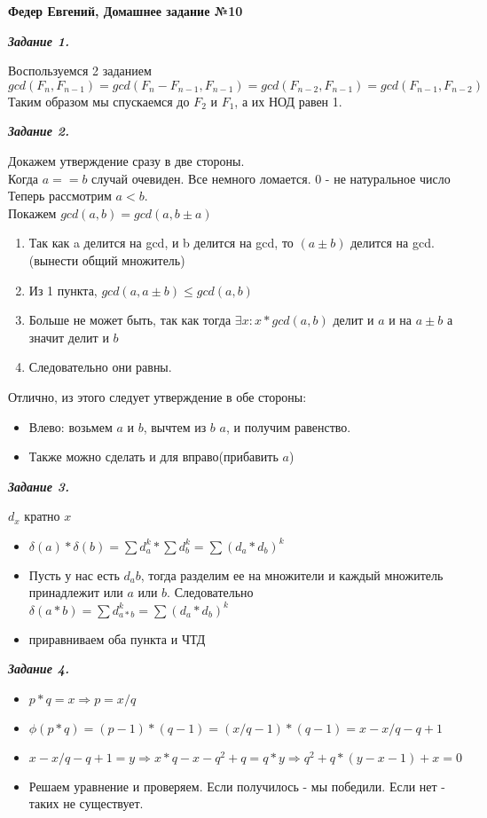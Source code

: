 \documentclass[12pt, a4paper]{scrartcl}
\begin{document}
	\LARGE{\textbf{Федер Евгений, Домашнее задание №10}}\par
	
	\emph{\textbf{Задание 1.}}\par
	Воспользуемся 2 заданием \\
	$gcd(F_n, F_{n - 1}) = gcd(F_n - F_{n - 1}, F_{n - 1}) = gcd(F_{n - 2}, F_{n - 1}) = gcd(F_{n - 1}, F_{n - 2})$ \\
	Таким образом мы спускаемся до $F_2$ и $F_1$, а их НОД равен 1.
	
	\emph{\textbf{Задание 2.}}\par
		Докажем утверждение сразу в две стороны.\\
		Когда $a == b$ случай очевиден. Все немного ломается. 0 - не натуральное число\\
		Теперь рассмотрим $a < b$.\\
		Покажем $gcd(a, b) = gcd(a, b \pm a)$ 
		\begin{enumerate}
			\item Так как a делится на gcd, и b делится на gcd, то $(a \pm b)$ делится на gcd.(вынести общий множитель)
			\item Из 1 пункта, $gcd(a, a \pm b) \leq gcd(a, b)$
			\item Больше не может быть, так как тогда $\exists x : x * gcd(a, b)$ делит и $a$ и на $a \pm b$ а значит делит и $b$
			\item Следовательно они равны.
		\end{enumerate}
		Отлично, из этого следует утверждение в обе стороны:
		\begin{itemize}
			\item Влево: возьмем $a$ и $b$, вычтем из $b$ $a$, и получим равенство.
			\item Также можно сделать и для вправо(прибавить $a$)
		\end{itemize}
	\emph{\textbf{Задание 3.}}\par
		$d_x$ кратно $x$
		\begin{itemize}
			\item $\delta(a) * \delta(b) = \sum d_a^k * \sum d_b^k = \sum (d_a * d_b) ^ k$
			\item Пусть у нас есть $d_ab$, тогда разделим ее на множители и каждый множитель принадлежит или $a$ или $b$. Следовательно $\delta(a * b) = \sum d_{a * b}^k = \sum (d_a * d_b) ^ k$ 
			\item приравниваем оба пункта и ЧТД
		\end{itemize}
	\emph{\textbf{Задание 4.}}\par
		\begin{itemize}
			\item $p*q = x \Rightarrow p = x / q$
			\item $\phi(p * q) = (p - 1) * (q - 1) = (x / q - 1) * (q - 1) = x - x / q - q + 1$
			\item $x - x / q - q + 1 = y \Rightarrow x * q - x - q ^ 2 + q = q * y \Rightarrow q^2 + q * (y - x - 1) + x = 0$
			\item Решаем уравнение и проверяем. Если получилось - мы победили. Если нет - таких не существует.
		\end{itemize}
\end{document}
